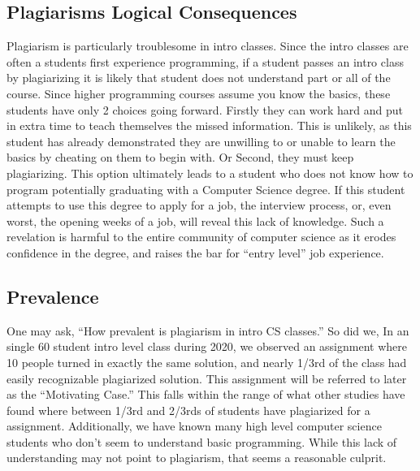 \documentclass[letterpaper,10pt,conference]{IEEEtran}
\begin{document}
	\subsection{Plagiarisms Logical Consequences}
		Plagiarism is particularly troublesome in intro classes.  Since the intro classes are often a students first experience programming, if a student passes an intro class by plagiarizing it is likely that student does not understand part or all of the course.  Since higher programming courses assume you know the basics, these students have only 2 choices going forward.  Firstly they can work hard and put in extra time to teach themselves the missed information.  This is unlikely, as this student has already demonstrated they are unwilling to or unable to learn the basics by cheating on them to begin with.
		Or Second, they must keep plagiarizing.  This option ultimately leads to a student who does not know how to program potentially graduating with a Computer Science degree.  If this student attempts to use this degree to apply for a job, the interview process, or, even worst, the opening weeks of a job, will reveal this lack of knowledge.  Such a revelation is harmful to the entire community of computer science as it erodes confidence in the degree, and raises the bar for ``entry level'' job experience.
		\subsection{Prevalence}
		 One may ask, ``How prevalent is plagiarism in intro CS classes.'' So did we, In an single 60 student intro level  class during 2020, we observed an assignment where 10 people turned in exactly the same solution, and nearly 1/3rd of the class had easily recognizable plagiarized solution.   This assignment will be referred to later as the ``Motivating Case.''
		 This falls within  the range of what other studies have found where between 1/3rd and 2/3rds of students have plagiarized for a assignment\cite{attitude}\cite{prevalent}.
		 Additionally, we have known many high level computer science students who don't seem to understand basic programming.  While this lack of understanding may not point to plagiarism, that seems a reasonable culprit.
		
\end{document}
